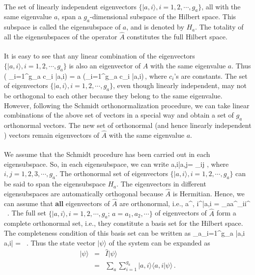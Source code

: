 \paragraph{}
The set of linearly independent eigenvectors $\{ |a,i\rangle, i=1,2, \cdots, g_a\}$, all with the same eigenvalue $a$, span a $g_a$-dimensional subspace of the Hilbert space. This subspace is called the eigensubspace of $a$, and is denoted by $H_a$. The totality of all the eigensubspaces of the operator $\hat{A}$ constitutes the full Hilbert space.

\paragraph{}
It is easy to see that any linear combination of the eigenvectors $\{ |a,i\rangle, i=1,2, \cdots, g_a\}$ is also an eigenvector of $\hat{A}$ with the same eigenvalue $a$. Thus
\be
{} \left( \sum_{i=1}^{g_a} c_i |a,i\rangle\right) = a \left(\sum_{i=1}^{g_a} c_i |a,i\rangle\right)\,,
\ee
where $c_i$'s are constants.
The set of eigenvectors $\{ |a,i\rangle, i=1,2, \cdots, g_a\}$, even though linearly independent, may not be orthogonal to each other
because they belong to the same eigenvalue. However, following the Schmidt orthonormalization procedure, we can take linear combinations of the above set of vectors in a special way and obtain a set of $g_a$ orthonormal vectors. The new set of orthonormal (and hence linearly independent ) vectors remain eigenvectors of $\hat{A}$ with the same eigenvalue $a$. 

\paragraph{}
We assume that the Schmidt procedure has been carried out in each eigensubspace. So, in each eigensubspace, we can write
\be 
\langle a,i|a,j\rangle = \delta_{ij} , 
\ee
where $i,j = 1,2,3, \cdots , g_a$. 
The orthonormal set of eigenvectors $\{ |a,i\rangle, i= 1,2, \cdots , g_a\}$ can be said to span the eigensubspace $H_a$.
The eigenvectors in different eigensubspaces are automatically orthogonal because $\hat{A}$ is Hermitian. Hence, we can assume that 
{\bf all}  eigenvectors of $\hat{A}$ are orthonormal, i.e.,
\be
\langle a^{\prime}, i^{\prime}|a,i \rangle = \delta_{aa^{\prime}}\delta_{ii^{\prime}} \, .
\ee
The full set $\{ |a, i\rangle, i=1,2, \cdots , g_a;\, a=a_1, a_2, \cdots\}$ of eigenvectors of $\hat{A}$ form a complete 
orthonormal set, i.e., they constitute a basis set for the Hilbert space. The completeness condition of this basis set can be written as 
\be 
\sum_a\sum_{i=1}^{g_a} |a,i \rangle \langle a,i| = \, .
\ee
Thus the state vector $|\psi\rangle$ of the system can be expanded as
\begin{eqnarray}
|\psi\rangle & = & \hat{I} |\psi\rangle \nonumber \\
             & = & \sum_a\sum_{i=1}^{g_a} |a,i \rangle \langle a,i|\psi\rangle\, .
\end{eqnarray}			

